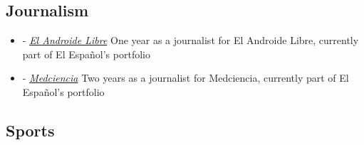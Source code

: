 \documentclass[11pt,a4paper,sans]{moderncv}        %
\begin{document}
\subsection{Journalism}
	\begin{addmargin}[6.5em]{0em}%
        \begin{itemize}
	\item[] - \underline{\textit{El Androide Libre}} One year as a journalist for El Androide Libre, currently part of El Español's portfolio
	\item - \underline{\textit{Medciencia}} Two years as a journalist for Medciencia, currently part of El Español's portfolio
	\end{itemize}
\end{addmargin}%
{}{}

\subsection{Sports}

\end{document}
